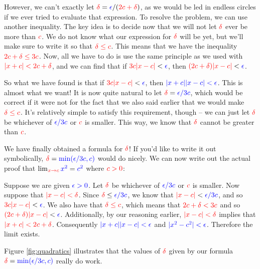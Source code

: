 \documentclass{myarticle}
\newcommand{\hor}[1]{\textcolor{red}{#1}} %
\newcommand{\ver}[1]{\textcolor{blue}{#1}}
\theoremstyle{nospace}
\newtheorem{old series theorem}{Theorem}
\newenvironment{series theorem}{\begin{mdframed}\begin{old series theorem}}{\end{old series theorem}\end{mdframed}}
\begin{document}
However, we can't exactly let $\hor{\delta} = \ver{\epsilon}/(\hor{2c + \delta})$, as we would be led in endless circles if we ever tried to evaluate that expression. To resolve the problem, we can use another inequality. The key idea is to decide now that we will not let $\hor{\delta}$ ever be more than $\hor{c}$. We do not know what our expression for $\hor{\delta}$ will be yet, but we'll make sure to write it so that $\hor{\delta \leq c}$. This means that we have the inequality $\hor{2c + \delta \leq 3c}$. Now, all we have to do is use the same principle as we used with $\hor{|x + c| < 2c + \delta}$, and we can find that if $\hor{3c|x - c|} < \ver{\epsilon}$, then $\hor{(2c + \delta)|x - c|} < \ver{\epsilon}$.

So what we have found is that if $\hor{3c|x - c|} < \ver{\epsilon}$, then $\ver{|x + c||x - c| < \epsilon}$. This is almost what we want! It is now quite natural to let $\hor{\delta} = \ver{\epsilon/3c}$, which would be correct if it were not for the fact that we also said earlier that we would make $\hor{\delta \leq c}$. It's relatively simple to satisfy this requirement, though -- we can just let $\hor{\delta}$ be whichever of $\ver{\epsilon/3c}$ or $\hor{c}$ is smaller. This way, we know that $\hor{\delta}$ cannot be greater than $\hor{c}$.

We have finally obtained a formula for $\hor{\delta}$! If you'd like to write it out symbolically, $\hor{\delta} = \ver{\min(\epsilon/3c, c)}$ would do nicely. We can now write out the actual proof that $\lim_{\hor{x \to c}} \ver{x^2} = \ver{c^2}$ where $\hor{c > 0}$:

\begin{mdframed} Suppose we are given $\ver{\epsilon > 0}$. Let $\hor{\delta}$ be whichever of $\ver{\epsilon/3c}$ or $\hor{c}$ is smaller. Now suppose that $\hor{|x - c| < \delta}$. Since $\hor{\delta} \leq \ver{\epsilon/3c}$, we know that $\hor{|x - c|} < \ver{\epsilon/3c}$, and so $\hor{3c|x - c|} < \ver{\epsilon}$. We also have that $\hor{\delta \leq c}$, which means that $\hor{2c + \delta < 3c}$ and so $\hor{(2c + \delta)|x - c|} < \ver{\epsilon}$. Additionally, by our reasoning earlier, $\hor{|x - c| < \delta}$ implies that $\hor{|x + c| < 2c + \delta}$. Consequently $\ver{|x + c||x - c| < \epsilon}$ and $\ver{|x^2 - c^2| < \epsilon}$. Therefore the limit exists.
\end{mdframed}

Figure \ref{fig:quadratics} illustrates that the values of $\hor{\delta}$ given by our formula $\hor{\delta} = \ver{\min(\epsilon/3c, c)}$ really do work.
\end{document}
